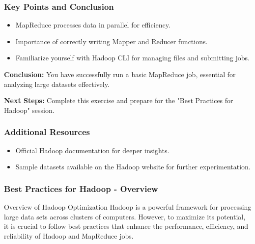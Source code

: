 \documentclass[aspectratio=169]{beamer}
\begin{document}
\begin{frame}[fragile]
  \frametitle{Key Points and Conclusion}
  \begin{itemize}
    \item MapReduce processes data in parallel for efficiency.
    \item Importance of correctly writing Mapper and Reducer functions.
    \item Familiarize yourself with Hadoop CLI for managing files and submitting jobs.
  \end{itemize}

  \textbf{Conclusion:}
  You have successfully run a basic MapReduce job, essential for analyzing large datasets effectively. 

  \textbf{Next Steps:}
  Complete this exercise and prepare for the "Best Practices for Hadoop" session.
\end{frame}

\begin{frame}[fragile]
  \frametitle{Additional Resources}
  \begin{itemize}
    \item Official Hadoop documentation for deeper insights.
    \item Sample datasets available on the Hadoop website for further experimentation.
  \end{itemize}
\end{frame}

\begin{frame}[fragile]
    \frametitle{Best Practices for Hadoop - Overview}
    \begin{block}{Overview of Hadoop Optimization}
        Hadoop is a powerful framework for processing large data sets across clusters of computers. However, to maximize its potential, it is crucial to follow best practices that enhance the performance, efficiency, and reliability of Hadoop and MapReduce jobs.
    \end{block}
\end{frame}
\end{document}
